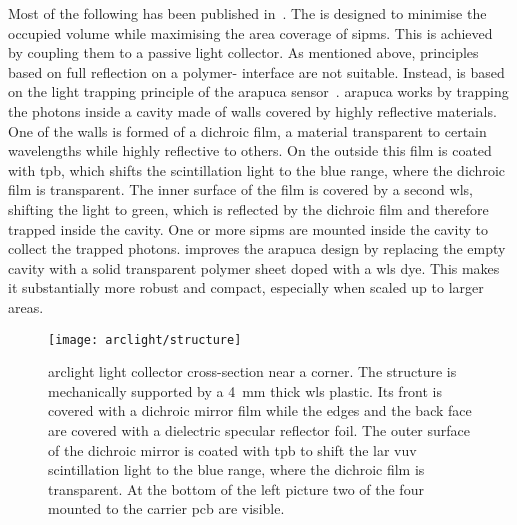 Most of the following has been published in~\cite{arclight}.
The \AL{} is designed to minimise the occupied volume while maximising the area coverage of \glspl{sipm}.
This is achieved by coupling them to a passive light collector.
As mentioned above, principles based on full reflection on a polymer-\lar{} interface are not suitable.
Instead, \AL{} is based on the light trapping principle of the \gls{arapuca} sensor~\cite{arapuca}.
\gls{arapuca} works by trapping the photons inside a cavity made of walls covered by highly reflective materials.
One of the walls is formed of a dichroic film, a material transparent to certain wavelengths while highly reflective to others.
On the outside this film is coated with \gls{tpb}, which shifts the \lar{} scintillation light to the blue range, where the dichroic film is transparent.
The inner surface of the film is covered by a second \gls{wls}, shifting the light to green, which is reflected by the dichroic film and therefore trapped inside the cavity.
One or more \glspl{sipm} are mounted inside the cavity to collect the trapped photons.
\AL{} improves the \gls{arapuca} design by replacing the empty cavity with a solid transparent polymer sheet doped with a \gls{wls} dye.
This makes it substantially more robust and compact, especially when scaled up to larger areas.

\begin{figure}[tbp]
	\centering
	\texttt{[image: arclight/structure]}
	\caption[ light collector cross-section]{%
		\acrshort{arclight} light collector cross-section near a corner.
		The structure is mechanically supported by a \SI{4}{\milli\metre} thick \acrshort{wls} plastic.
		Its front is covered with a dichroic mirror film while the edges and the back face are covered with a dielectric specular reflector foil.
		The outer surface of the dichroic mirror is coated with \acrshort{tpb} to shift the \acrshort{lar} \acrshort{vuv} scintillation light to the blue range, where the dichroic film is transparent.
		At the bottom of the left picture two of the four  mounted to the carrier \acrshort{pcb} are visible.
	}
	\label{fig:arclight_structure}
\end{figure}

